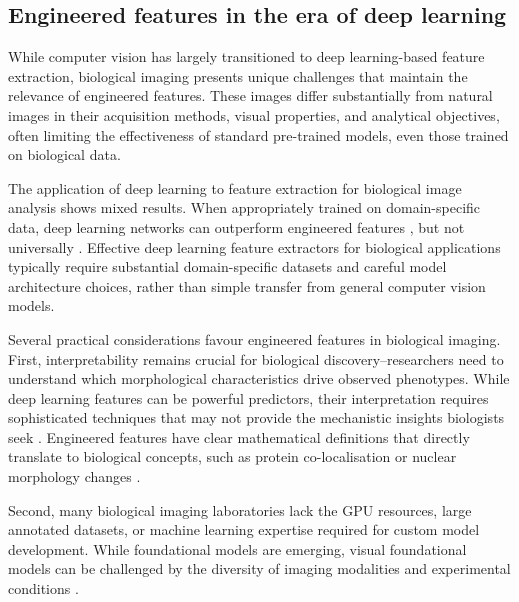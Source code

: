 \documentclass{article}
\begin{document}
\subsection{Engineered features in the era of deep learning}
\label{sec:org9dc3dfa}

While computer vision has largely transitioned to deep learning-based feature extraction, biological imaging presents unique challenges that maintain the relevance of engineered features. These images differ substantially from natural images in their acquisition methods, visual properties, and analytical objectives, often limiting the effectiveness of standard pre-trained models, even those trained on biological data.

The application of deep learning to feature extraction for biological image analysis shows mixed results.
When appropriately trained on domain-specific data, deep learning networks can outperform engineered features \cite{lafargeCapturingSingleCellPhenotypic2019,moshkovLearningRepresentationsImagebased2022,chowPredictingDrugPolypharmacology2022,wolfSCANPYLargescaleSinglecell2018}, but not universally \cite{tangMorphologicalProfilingDrug2024,kimSelfsupervisionAdvancesMorphological2023}. 
Effective deep learning feature extractors for biological applications typically require substantial domain-specific datasets and careful model architecture choices, rather than simple transfer from general computer vision models.

Several practical considerations favour engineered features in biological imaging. 
First, interpretability remains crucial for biological discovery--researchers need to understand which morphological characteristics drive observed phenotypes. 
While deep learning features can be powerful predictors, their interpretation requires sophisticated techniques that may not provide the mechanistic insights biologists seek \citep{liChallengesOpportunitiesBioimage2023}. 
Engineered features have clear mathematical definitions that directly translate to biological concepts, such as protein co-localisation or nuclear morphology changes \cite{garcia-fossaInterpretingImagebasedProfiles2023}.

Second, many biological imaging laboratories lack the GPU resources, large annotated datasets, or machine learning expertise required for custom model development. While foundational models are emerging, visual foundational models can be challenged by the diversity of imaging modalities and experimental conditions \cite{azadFoundationalModelsMedical2023}.
\end{document}

